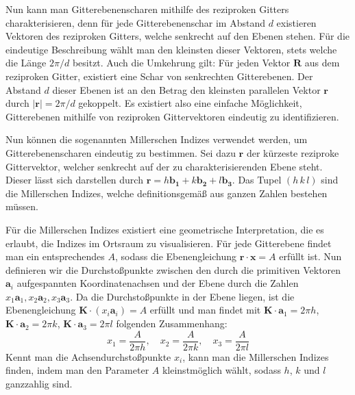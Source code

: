 Nun kann man Gitterebenenscharen mithilfe des reziproken Gitters charakterisieren, denn für jede
Gitterebenenschar im Abstand $d$ existieren Vektoren des reziproken Gitters, welche senkrecht auf den Ebenen stehen.
Für die eindeutige Beschreibung wählt man den kleinsten dieser Vektoren, stets welche die Länge $2 \pi / d$ besitzt.
Auch die Umkehrung gilt: Für jeden Vektor $\mathbf{R}$ aus dem reziproken Gitter, existiert eine Schar von senkrechten
Gitterebenen.
Der Abstand $d$ dieser Ebenen ist an den Betrag den kleinsten parallelen Vektor $\mathbf{r}$ durch $\lvert \mathbf{r}
\rvert=2\pi  /d$ gekoppelt.
Es existiert also eine einfache Möglichkeit, Gitterebenen mithilfe von reziproken Gittervektoren eindeutig zu
identifizieren. \autocite[113]{Ashcroft}

Nun können die sogenannten Millerschen Indizes verwendet werden, um Gitterebenenscharen eindeutig zu bestimmen.
Sei dazu $\mathbf{r}$ der kürzeste reziproke Gittervektor, welcher senkrecht auf der zu charakterisierenden Ebene steht.
Dieser lässt sich darstellen durch $ \mathbf{r} = h \mathbf{b_1} + k \mathbf{b_2} + l \mathbf{b_3}$.
Das Tupel $(h\, k\,l)$ sind die Millerschen Indizes, welche definitionsgemäß aus ganzen Zahlen bestehen müssen.


Für die Millerschen Indizes existiert eine geometrische Interpretation, die es erlaubt, die Indizes im Ortsraum zu
visualisieren.
Für jede Gitterebene findet man ein entsprechendes $A$, sodass die Ebenengleichung $\mathbf{r} \cdot \mathbf{x} = A$
erfüllt ist.
Nun definieren wir die Durchstoßpunkte zwischen den durch die primitiven Vektoren $\mathbf{a}_i$ aufgespannten
Koordinatenachsen und der Ebene durch die Zahlen $x_{1}\mathbf{a}_{1}, x_{2}\mathbf{a}_{2}, x_{3}\mathbf{a}_{3}$.
Da die Durchstoßpunkte in der Ebene liegen, ist die Ebenengleichung $\mathbf{K}\cdot(x_{i}\mathbf{a}_{i})=A$ erfüllt und
man findet mit $\mathbf{K}\cdot\mathbf{a}_{1}=2\pi h$, $\mathbf{K}\cdot \mathbf{a}_{2}=2\pi k$,
$ \mathbf{K}\cdot \mathbf{a}_{3}=2\pi l$ folgenden Zusammenhang:
\begin{equation*}
    x_{1}=\frac{A}{2\pi h}, \quad x_{2}=\frac{A}{2\pi k}, \quad x_{3} =\frac{A}{2\pi l}
\end{equation*}
Kennt man die Achsendurchstoßpunkte $x_i$, kann man die Millerschen Indizes finden, indem man den Parameter $A$
kleinstmöglich wählt, sodass $h$, $k$ und $l$ ganzzahlig sind. \autocite[115]{Ashcroft}

